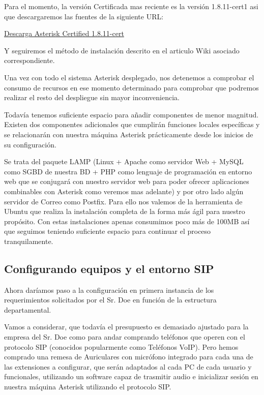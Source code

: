 Para el momento, la versión Certificada mas reciente es la versión 1.8.11-cert1 asi que descargaremos las fuentes de la siguiente URL:

\href{http://downloads.asterisk.org/pub/telephony/certified-asterisk/releases/certified-asterisk-1.8.11-cert1.tar.gz}{Descarga Asterisk Certified 1.8.11-cert}

Y seguiremos el método de instalación descrito en el articulo Wiki asociado correspondiente.

Una vez con todo el sistema Asterisk desplegado, nos detenemos a comprobar el consumo de recursos en ese momento determinado para comprobar que podremos realizar el resto del despliegue sin mayor inconveniencia.


Todavía tenemos suficiente espacio para añadir componentes de menor magnitud. Existen dos componentes adicionales que cumplirán funciones locales específicas y se relacionarán con nuestra máquina Asterisk prácticamente desde los inicios de su configuración. 

Se trata del paquete LAMP (Linux + Apache como servidor Web + MySQL como SGBD de nuestra BD + PHP como lenguaje de programación en entorno web que se conjugará con nuestro servidor web para poder ofrecer aplicaciones combinables con Asterisk como veremos mas adelante) y por otro lado algún servidor de Correo como Postfix. Para ello nos valemos de la herramienta  de Ubuntu que realiza la instalación completa de la forma más ágil para nuestro propósito. Con estas instalaciones apenas consumimos poco más de 100MB así que seguimos teniendo suficiente espacio para continuar el proceso tranquilamente.

\newpage

\subsection{Configurando equipos y el entorno SIP}

Ahora daríamos paso a la configuración en primera instancia de los requerimientos solicitados por el Sr. Doe en función de la estructura departamental.

Vamos a considerar, que todavía el presupuesto es demasiado ajustado para la empresa del Sr. Doe como para andar comprando teléfonos que operen con el protocolo SIP (conocidos popularmente como Teléfonos VoIP). Pero hemos comprado una remesa de Auriculares con micrófono integrado para cada una de las extensiones a configurar, que serán adaptados al cada PC de cada usuario y funcionales, utilizando un software capaz de trasmitir audio e inicializar sesión en nuestra máquina Asterisk utilizando el protocolo SIP.

